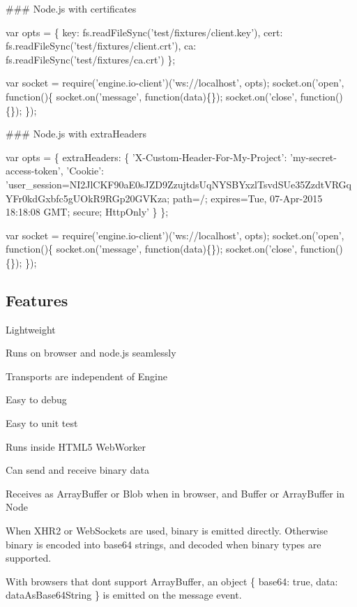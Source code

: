 \#\#\# Node.\+js with certificates 
\begin{DoxyCode}
var opts = \{
  key: fs.readFileSync('test/fixtures/client.key'),
  cert: fs.readFileSync('test/fixtures/client.crt'),
  ca: fs.readFileSync('test/fixtures/ca.crt')
\};

var socket = require('engine.io-client')('ws://localhost', opts);
socket.on('open', function()\{
  socket.on('message', function(data)\{\});
  socket.on('close', function()\{\});
\});
\end{DoxyCode}


\#\#\# Node.\+js with extra\+Headers 
\begin{DoxyCode}
var opts = \{
  extraHeaders: \{
    'X-Custom-Header-For-My-Project': 'my-secret-access-token',
    'Cookie':
       'user\_session=NI2JlCKF90aE0sJZD9ZzujtdsUqNYSBYxzlTsvdSUe35ZzdtVRGqYFr0kdGxbfc5gUOkR9RGp20GVKza; path=/; expires=Tue, 07-Apr-2015 18:18:08 GMT; secure; HttpOnly'
  \}
\};

var socket = require('engine.io-client')('ws://localhost', opts);
socket.on('open', function()\{
  socket.on('message', function(data)\{\});
  socket.on('close', function()\{\});
\});
\end{DoxyCode}


\subsection*{Features}


\begin{DoxyItemize}
\item Lightweight
\item Runs on browser and node.\+js seamlessly
\item Transports are independent of {\ttfamily Engine}
\begin{DoxyItemize}
\item Easy to debug
\item Easy to unit test
\end{DoxyItemize}
\item Runs inside H\+T\+M\+L5 Web\+Worker
\item Can send and receive binary data
\begin{DoxyItemize}
\item Receives as Array\+Buffer or Blob when in browser, and Buffer or Array\+Buffer in Node
\item When X\+H\+R2 or Web\+Sockets are used, binary is emitted directly. Otherwise binary is encoded into base64 strings, and decoded when binary types are supported.
\item With browsers that don\textquotesingle{}t support Array\+Buffer, an object \{ base64\+: true, data\+: data\+As\+Base64\+String \} is emitted on the {\ttfamily message} event.
\end{DoxyItemize}
\end{DoxyItemize}

